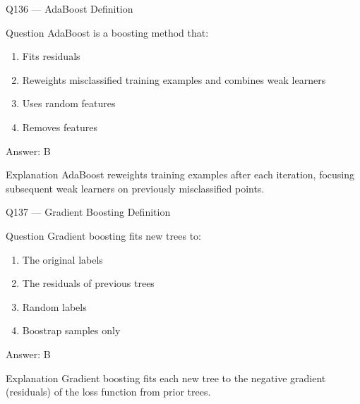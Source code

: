 \documentclass[aspectratio=169,8pt]{beamer}
\begin{document}
	\begin{frame}{Q136 --- AdaBoost Definition}
		\begin{block}{Question}
			AdaBoost is a boosting method that:
			\begin{enumerate}
				\item Fits residuals
				\item Reweights misclassified training examples and combines weak learners
				\item Uses random features
				\item Removes features
			\end{enumerate}
		\end{block}
		\begin{exampleblock}{Answer: B}\end{exampleblock}
		\begin{block}{Explanation}
			AdaBoost reweights training examples after each iteration, focusing subsequent weak learners on previously misclassified points.
		\end{block}
	\end{frame}
	
	\begin{frame}{Q137 --- Gradient Boosting Definition}
		\begin{block}{Question}
			Gradient boosting fits new trees to:
			\begin{enumerate}
				\item The original labels
				\item The residuals of previous trees
				\item Random labels
				\item Boostrap samples only
			\end{enumerate}
		\end{block}
		\begin{exampleblock}{Answer: B}\end{exampleblock}
		\begin{block}{Explanation}
			Gradient boosting fits each new tree to the negative gradient (residuals) of the loss function from prior trees.
		\end{block}
	\end{frame}
	
\end{document}
